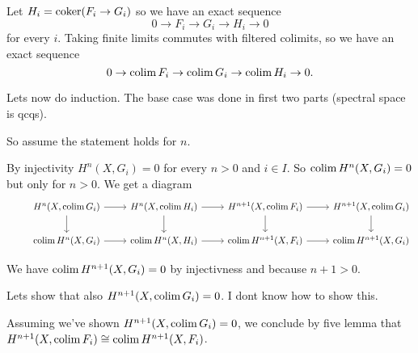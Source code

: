 \begin{exercise}{4}
\begin{enumerate}
{                Let $H_i = \operatorname{coker}(F_i \to G_i)$ so we have an exact sequence
                \begin{equation*}
                    0 \to F_i \to G_i \to H_i \to 0
                \end{equation*}
                for every $i$.
                Taking finite limits commutes with filtered colimits, so we have
                an exact sequence
                \begin{equation*}
                    0 \to \operatorname{colim} F_i \to \operatorname{colim} G_i \to \operatorname{colim} H_i \to 0.
                \end{equation*}

                Lets now do induction. The base case was done in first two parts
                (spectral space is qcqs).

                So assume the statement holds for $n$.

                By injectivity $H^n(X, G_i) = 0$ for every $n > 0$ and $i \in
                I$. So $\operatorname{colim} H^n(X, G_i) = 0$ but only for $n > 0$.
                We get a diagram
                \begin{equation*}
                    \begin{tikzcd}
                        &H^n(X, \colim G_i) \arrow{r} \arrow{d} &H^n(X, \colim
                        H_i) \arrow{r} \arrow{d} &H^{n+1}(X, \colim F_i)
                        \arrow{d} \arrow{r} &H^{n+1}(X, \colim G_i) \arrow{d} \\
                        &\colim H^n(X, G_i) \arrow{r} &\colim H^n(X, H_i)
                        \arrow{r} &\colim H^{n+1}(X, F_i) \arrow{r} &\colim
                        H^{n+1}(X, G_i)
                    \end{tikzcd}
                \end{equation*}

                We have $\operatorname{colim} H^{n+1}(X, G_i) = 0$ by injectivness and because
                $n + 1 > 0$.

                Lets show that also $H^{n+1}(X, \operatorname{colim} G_i) = 0$.
                I dont know how to show this.

                Assuming we've shown $H^{n+1}(X, \operatorname{colim} G_i) = 0$, we conclude
                by five lemma that $H^{n+1}(X, \operatorname{colim} F_i) \cong \operatorname{colim} H^{n+1}(X,
                F_i)$.
            }
    \end{enumerate}
\end{exercise}



